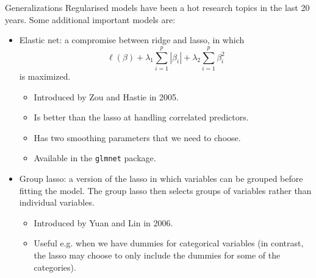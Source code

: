 \documentclass[10pt]{beamer}
\begin{document}
\begin{frame}{Generalizations}
Regularised models have been a hot research topics in the last 20 years. Some additional important models are:\pause
\begin{itemize}
\item {\color{uured}Elastic net:} a compromise between ridge and lasso, in which $$\ell(\beta)+\lambda_1\sum_{i=1}^p|\beta_i|+\lambda_2\sum_{i=1}^p\beta_i^2$$ is maximized.\pause
\begin{itemize}
\item Introduced by Zou and Hastie in 2005.\pause
\item Is better than the lasso at handling correlated predictors.\pause
\item Has two smoothing parameters that we need to choose.\pause
\item Available in the \texttt{glmnet} package.\\[3mm]\pause
\end{itemize}
\item {\color{uured}Group lasso:} a version of the lasso in which variables can be grouped before fitting the model. The group lasso then selects groups of variables rather than individual variables.\pause
\begin{itemize}
\item Introduced by Yuan and Lin in 2006.\pause
\item Useful e.g. when we have dummies for categorical variables (in contrast, the lasso may choose to only include the dummies for some of the categories).
\end{itemize}
\end{itemize}
\end{frame}
\end{document}
